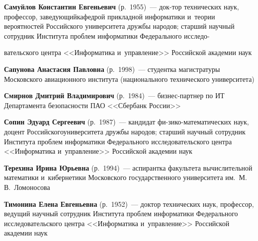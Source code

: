 \begin{multicols}{2}
 
\noindent
\textbf{Самуйлов Константин Евгеньевич} (р.\ 1955)~---
 док-\linebreak тор технических наук, профессор, за\-ве\-ду\-ющий\linebreak кафедрой прикладной 
 информатики и~тео\-рии ве\-ро\-ят\-ностей Российского университета
 дружбы \mbox{народов}; старший научный сотрудник Института 
проб\-лем информатики
Федерального исследо-\linebreak\vspace*{-12pt}

\columnbreak

\noindent
вательского 
 центра <<Информатика и~управ\-ле\-ние>> Российской академии наук
 
 
 \noindent
\textbf{Сапунова Анастасия Павловна} (р.\ 1998)~--- 
студентка магистратуры Московского авиационного института 
(национального технического университета)

 
 \noindent
\textbf{Смирнов Дмитрий Владимирович} (р.\ 1984)~--- 
биз\-нес-парт\-нер по ИТ Департамента безопасности ПАО <<Сбербанк России>>

 
 \noindent
\textbf{Сопин Эдуард Сергеевич} (р.\ 1987)~--- 
кандидат фи-\linebreak зи\-ко-ма\-те\-ма\-ти\-че\-ских наук, 
доцент Российского\linebreak университета дружбы народов; старший научный сотрудник 
Института проб\-лем информатики Федерального исследовательского центра 
<<Информатика и~управ\-ле\-ние>> Российской академии наук

 
  \noindent
\textbf{Терехина Ирина Юрьевна} (р.\ 1994)~--- 
аспирантка факультета вычислительной математики 
и~кибернетики Московского государственного университета 
им.\ М.\,В.~Ломоносова


 
 \noindent
\textbf{Тимонина Елена Евгеньевна} (р.\ 1952)~--- 
доктор технических наук, профессор, ведущий научный сотруд\-ник Института 
проб\-лем информатики Федерального исследовательского центра 
<<Информатика и~управ\-ле\-ние>> Российской академии наук


\end{multicols}
